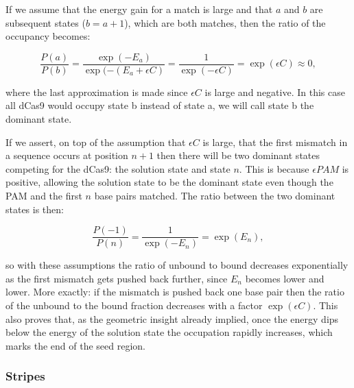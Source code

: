 If we assume that the energy gain for a match is large and that $a$ and $b$ are subsequent states ($b = a+1$), which are both matches, then the ratio of the occupancy becomes:

\begin{equation}
\frac{P(a)}{P(b)} = \frac{\exp(-E_a)}{\exp(-(E_a + \epsilon C)} = \frac{1}{\exp(-\epsilon C)} = \exp(\epsilon C) \approx 0,
\end{equation}

where the last approximation is made since $\epsilon C$ is large and negative. In this case all dCas9 would occupy state b instead of state a, we will call state b the dominant state.

If we assert, on top of the assumption that $\epsilon C$ is large, that the first mismatch in a sequence occurs at position $n+1$ then there will be two dominant states competing for the dCas9: the solution state and state $n$. This is because $\epsilon PAM$ is positive, allowing the solution state to be the dominant state even though the PAM and the first $n$ base pairs matched. The ratio between the two dominant states is then:

\begin{equation}
\frac{P(-1)}{P(n)} = \frac{1}{\exp(-E_n)} = \exp(E_n),
\end{equation}

so with these assumptions the ratio of unbound to bound decreases exponentially as the first mismatch gets pushed back further, since $E_n$ becomes lower and lower. More exactly: if the mismatch is pushed back one base pair then the ratio of the unbound to the bound fraction decreases with a factor $\exp(\epsilon C)$. %
This also proves that, as the geometric insight already implied, once the energy dips below the energy of the solution state the occupation rapidly increases, which marks the end of the seed region.


\subsubsection{Stripes}

